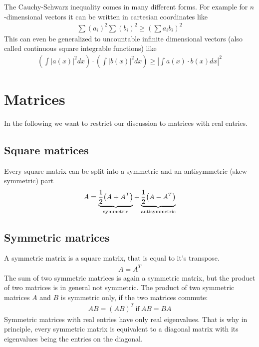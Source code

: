 The Cauchy-Schwarz inequality comes in many different forms. For example
for $n$-dimensional vectors it can be written in cartesian coordinates
like 
\begin{align}
\sum (a_i)^2 \sum (b_i)^2 \geq \left(\sum a_i b_i \right)^2
\end{align} 
This can even be generalized to uncountable infinite dimensional
vectors (also called continuous square integrable functions) like 
\begin{align}
\left(\int \left|a(x)\right|^2 dx\right) \cdot \left(\int \left|b(x)\right|^2 dx\right) \geq \left|\int a(x) \cdot b(x)dx\right|^2
\end{align}

\section{Matrices}

In the following we want to restrict our discussion to matrices with
real entries.

\subsection{Square matrices}
Every square matrix can be split into a symmetric and an antisymmetric
(skew-symmetric) part 
\begin{align}
A=\underbrace{\frac{1}{2}{ \left( A + A^T \right) }}_{\text{symmetric}}
+\underbrace{\frac{1}{2}{ \left( A - A^T \right) }}_{\text{antisymmetric}}
\end{align}


\subsection{Symmetric matrices}

A symmetric matrix is a square matrix, that is equal to it's transpose.
\begin{align}
A = A^T
\end{align} 
The sum of two symmetric matrices is again a symmetric matrix, but
the product of two matrices is in general not symmetric. The product of
two symmetric matrices $A$ and $B$ is symmetric only, if the two
matrices commute: 
\begin{align}
AB = (AB)^T \ \text{if}\ AB = BA
\end{align} 
Symmetric matrices with real entries have only real eigenvalues. That
is why in principle, every symmetric matrix is equivalent to a diagonal
matrix with its eigenvalues being the entries on the diagonal.

